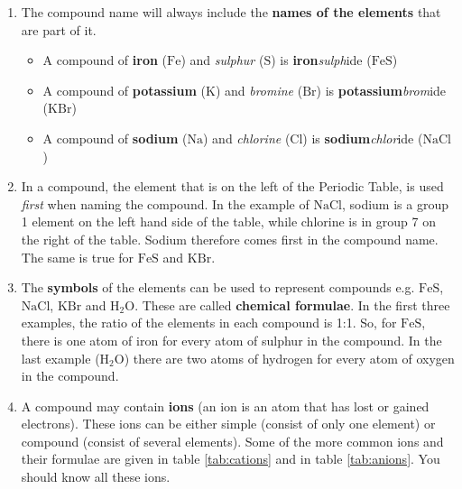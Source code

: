       \label{m38708*id64037}\begin{enumerate}[noitemsep, label=\textbf{\arabic*}. ] 
            \label{m38708*uid35}\item The compound name will always include the \textbf{names of the elements} that are part of it.
\label{m38708*id64059}\begin{itemize}[noitemsep]
            \label{m38708*uid36}\item A compound of \textbf{iron} ($\mathrm{Fe}$) and \textsl{sulphur} ($\mathrm{S}$) is \textbf{iron}\hspace{1ex}\textsl{sulph}ide ($\mathrm{FeS}$)
\label{m38708*uid37}\item A compound of \textbf{potassium} ($\mathrm{K}$) and \textsl{bromine} ($\mathrm{Br}$) is \textbf{potassium}\hspace{1ex}\textsl{brom}ide ($\mathrm{KBr}$)
\label{m38708*uid38}\item A compound of \textbf{sodium} ($\mathrm{Na}$) and \textsl{chlorine} ($\mathrm{Cl}$) is \textbf{sodium}\hspace{1ex}\textsl{chlor}ide ($\mathrm{NaCl}$)
\end{itemize}
        \label{m38708*uid39}\item In a compound, the element that is on the left of the Periodic Table, is used \textsl{first} when naming the compound. In the example of $\mathrm{NaCl}$, sodium is a group 1 element on the left hand side of the table, while chlorine is in group 7 on the right of the table. Sodium therefore comes first in the compound name. The same is true for $\mathrm{FeS}$ and $\mathrm{KBr}$.
\label{m38708*uid40}\item The \textbf{symbols} of the elements can be used to represent compounds e.g. $\mathrm{FeS}$, $\mathrm{NaCl}$, $\mathrm{KBr}$ and $\mathrm{H}{}_{2}\mathrm{O}$. These are called \textbf{chemical formulae}. In the first three examples, the ratio of the elements in each compound is 1:1. So, for $\mathrm{FeS}$, there is one atom of iron for every atom of sulphur in the compound. In the last example ($\mathrm{H}{}_{2}\mathrm{O}$) there are two atoms of hydrogen for every atom of oxygen in the compound.
\item A compound may contain \textbf{ions} (an ion is an atom that has lost or gained electrons). These ions can be either simple (consist of only one element) or compound (consist of several elements). Some of the more common ions and their formulae are given in table \ref{tab:cations} and in table \ref{tab:anions}. You should know all these ions.\\


\end{enumerate}
